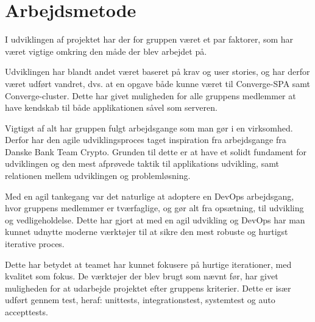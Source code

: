 \section{Arbejdsmetode}

I udviklingen af projektet har der for gruppen været et par faktorer, som har været vigtige omkring den måde der blev arbejdet på.

Udviklingen har blandt andet været baseret på krav og user stories, og har derfor været udført vandret, dvs. at en opgave både kunne været til Converge-SPA samt Converge-cluster. Dette har givet muligheden for alle gruppens medlemmer at have kendskab til både applikationen såvel som serveren.

Vigtigst af alt har gruppen fulgt arbejdsgange som man gør i en virksomhed. Derfor har den agile udviklingsproces taget inspiration fra arbejdsgange fra Danske Bank Team Crypto. Grunden til dette er at have et solidt fundament for udviklingen og den mest afprøvede taktik til applikations udvikling, samt relationen mellem udviklingen og problemløsning.

Med en agil tankegang var det naturlige at adoptere en DevOps arbejdsgang, hvor gruppens medlemmer er tværfaglige, og gør alt fra opsætning, til udvikling og vedligeholdelse. Dette har gjort at med en agil udvikling og DevOps har man kunnet udnytte moderne værktøjer til at sikre den mest robuste og hurtigst iterative proces.

Dette har betydet at teamet har kunnet fokusere på hurtige iterationer, med kvalitet som fokus. De værktøjer der blev brugt som nævnt før, har givet muligheden for at udarbejde projektet efter gruppens kriterier. Dette er især udført gennem test, heraf: unittests, integrationstest, systemtest og auto accepttests.
